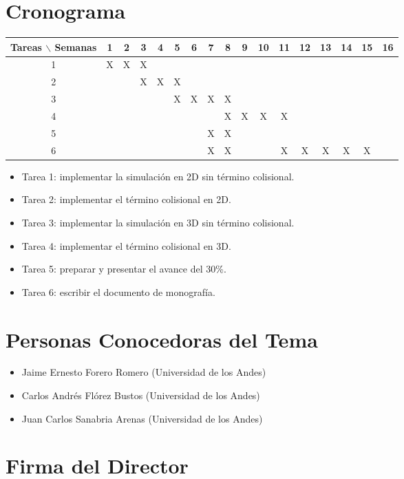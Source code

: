 \documentclass[12pt]{article}
\begin{document}
\section{Cronograma}

\begin{table}[htb]
	\begin{tabular}{|c|cccccccccccccccc| }
	\hline
	Tareas $\backslash$ Semanas & 1 & 2 & 3 & 4 & 5 & 6 & 7 & 8 & 9 & 10 & 11 & 12 & 13 & 14 & 15 & 16  \\
	\hline
	1 & X & X & X  &   &   &   &   &  &  &   &   &   &   &   &   &   \\
	2 &   &  & X & X & X &  &  &   &   &  &  &  &   &  &  &   \\
	3 &   &   &   &  & X  & X  & X  & X &   &   &   &  &   &   &  &   \\
	4 &  &  &  &  &  &  &  & X & X & X & X &   &   &   &   &   \\
    5 &  &  &  &  &  &  & X & X &  &  &  &   &   &   &   &   \\
	6 &   &   &   &   &  &   &  X & X  &  &   &  X & X &  X & X  & X &   \\
	\hline
	\end{tabular}
\end{table}
\vspace{1mm}

\begin{itemize}
	\item Tarea 1: implementar la simulación en 2D sin término colisional.
	\item Tarea 2: implementar el término colisional en 2D.
	\item Tarea 3: implementar la simulación en 3D sin término colisional.
    \item Tarea 4: implementar el término colisional en 3D.
    \item Tarea 5: preparar y presentar el avance del 30\%.
    \item Tarea 6: escribir el documento de monografía.
    
\end{itemize}

\section{Personas Conocedoras del Tema}


\begin{itemize}
	\item Jaime Ernesto Forero Romero (Universidad de los Andes)
	\item Carlos Andrés Flórez Bustos (Universidad de los Andes)
	\item Juan Carlos Sanabria Arenas (Universidad de los Andes)
\end{itemize}


{}


\section*{Firma del Director}
\vspace{1.5cm}
\end{document}
